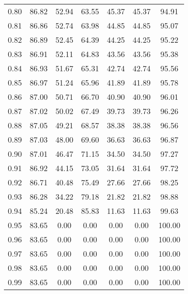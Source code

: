 \begin{tabular}{|c|c|c|c|c|c|c|}
      0.80 &     86.82 &     52.94 &      63.55 &   45.37 &      45.37 &         94.91 \\
      0.81 &     86.86 &     52.74 &      63.98 &   44.85 &      44.85 &         95.07 \\
      0.82 &     86.89 &     52.45 &      64.39 &   44.25 &      44.25 &         95.22 \\
      0.83 &     86.91 &     52.11 &      64.83 &   43.56 &      43.56 &         95.38 \\
      0.84 &     86.93 &     51.67 &      65.31 &   42.74 &      42.74 &         95.56 \\
      0.85 &     86.97 &     51.24 &      65.96 &   41.89 &      41.89 &         95.78 \\
      0.86 &     87.00 &     50.71 &      66.70 &   40.90 &      40.90 &         96.01 \\
      0.87 &     87.02 &     50.02 &      67.49 &   39.73 &      39.73 &         96.26 \\
      0.88 &     87.05 &     49.21 &      68.57 &   38.38 &      38.38 &         96.56 \\
      0.89 &     87.03 &     48.00 &      69.60 &   36.63 &      36.63 &         96.87 \\
      0.90 &     87.01 &     46.47 &      71.15 &   34.50 &      34.50 &         97.27 \\
      0.91 &     86.92 &     44.15 &      73.05 &   31.64 &      31.64 &         97.72 \\
      0.92 &     86.71 &     40.48 &      75.49 &   27.66 &      27.66 &         98.25 \\
      0.93 &     86.28 &     34.22 &      79.18 &   21.82 &      21.82 &         98.88 \\
      0.94 &     85.24 &     20.48 &      85.83 &   11.63 &      11.63 &         99.63 \\
      0.95 &     83.65 &      0.00 &       0.00 &    0.00 &       0.00 &        100.00 \\
      0.96 &     83.65 &      0.00 &       0.00 &    0.00 &       0.00 &        100.00 \\
      0.97 &     83.65 &      0.00 &       0.00 &    0.00 &       0.00 &        100.00 \\
      0.98 &     83.65 &      0.00 &       0.00 &    0.00 &       0.00 &        100.00 \\
      0.99 &     83.65 &      0.00 &       0.00 &    0.00 &       0.00 &        100.00 \\
\bottomrule
\end{tabular}
